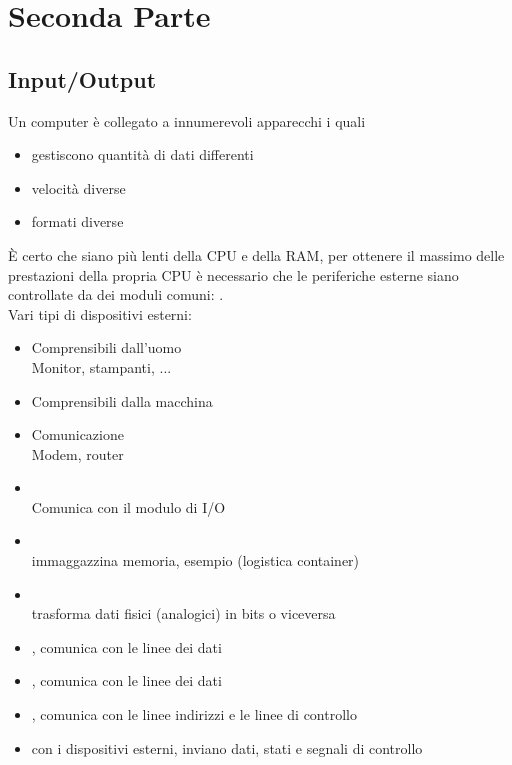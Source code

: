 \documentclass[arch.tex]{subfiles}
\begin{document}
\chapter{Seconda Parte}
\section{Input/Output}%
\label{sub:input_output}
Un computer è collegato a innumerevoli apparecchi i quali

\begin{itemize}
	\item gestiscono quantità di dati differenti
	\item velocità diverse
	\item formati diverse
\end{itemize}
È certo che siano più lenti della CPU e della RAM, per ottenere il massimo delle
prestazioni della propria CPU è necessario che le periferiche esterne siano 
controllate da dei moduli comuni: .\\
Vari tipi di dispositivi esterni:
\begin{itemize}
	\item Comprensibili dall'uomo\\
		Monitor, stampanti, ...
	\item Comprensibili dalla macchina
	\item Comunicazione\\
		Modem, router
\end{itemize}

%
\label{ppar:Componenti di un dispositivo esterno}



\begin{itemize}
	\item {}\\
		Comunica con il modulo di I/O
	\item {}\\
		immaggazzina memoria, esempio (logistica container)
	\item {}\\
		trasforma dati fisici (analogici) in bits o viceversa
\end{itemize}

%
\label{ppar:Componenti Modulo I/O}



\begin{itemize}
	\item {}, comunica con le linee dei dati
	\item {}, comunica con le linee dei dati
        \item {}, comunica con le linee indirizzi e le linee di controllo
	\item {} con i dispositivi esterni, 
		inviano dati, stati e segnali di controllo
\end{itemize}
\end{document}
